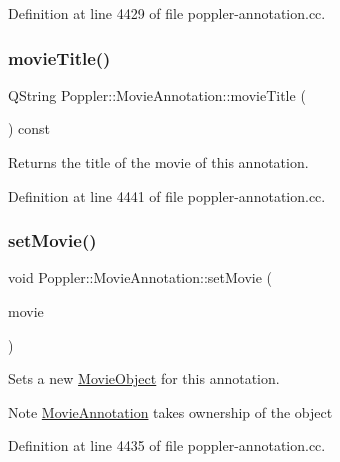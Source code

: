 Definition at line 4429 of file poppler-\/annotation.\+cc.

\mbox{\label{class_poppler_1_1_movie_annotation_a89535a87130b5cfc16bd42106c79e005}} 
\subsubsection{\texorpdfstring{movie\+Title()}{movieTitle()}}
{\footnotesize\ttfamily Q\+String Poppler\+::\+Movie\+Annotation\+::movie\+Title (\begin{DoxyParamCaption}{ }\end{DoxyParamCaption}) const}

Returns the title of the movie of this annotation. 

Definition at line 4441 of file poppler-\/annotation.\+cc.

\mbox{\label{class_poppler_1_1_movie_annotation_a6f7d27ddbeaa1e55dd0b41c7ed4a0eed}} 
\subsubsection{\texorpdfstring{set\+Movie()}{setMovie()}}
{\footnotesize\ttfamily void Poppler\+::\+Movie\+Annotation\+::set\+Movie (\begin{DoxyParamCaption}\item[{\hyperlink{class_poppler_1_1_movie_object}{Movie\+Object} $\ast$}]{movie }\end{DoxyParamCaption})}

Sets a new \hyperlink{class_poppler_1_1_movie_object}{Movie\+Object} for this annotation.

\begin{DoxyNote}{Note}
\hyperlink{class_poppler_1_1_movie_annotation}{Movie\+Annotation} takes ownership of the object 
\end{DoxyNote}


Definition at line 4435 of file poppler-\/annotation.\+cc.

\mbox{\label{class_poppler_1_1_movie_annotation_a446aa7855bfe9e4bf75b795dd0dd0019}} 
